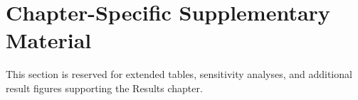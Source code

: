 
\section*{Chapter-Specific Supplementary Material}
\label{sec:supp_results}

This section is reserved for extended tables, sensitivity analyses, and
additional result figures supporting the Results chapter.
